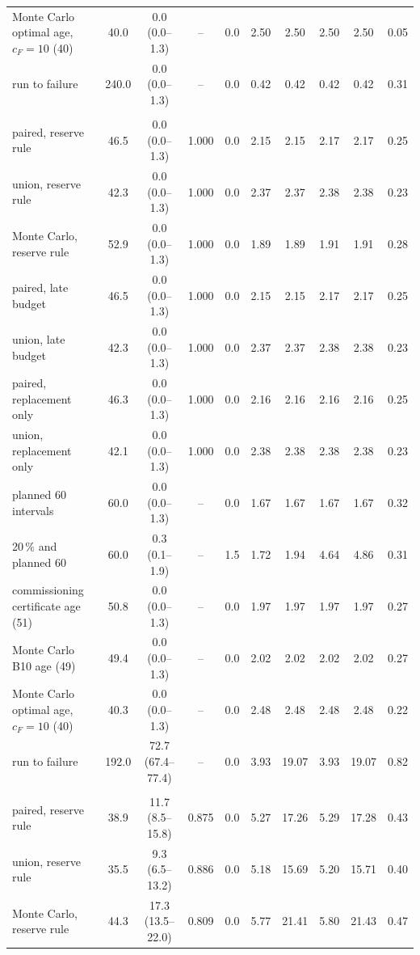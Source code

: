 \begin{table}[htbp]
\begin{tabular*}{\textwidth}{@{\extracolsep{\fill}}lccccccccc@{}}
Monte Carlo optimal age, $c_F=10$ (40) & 40.0 & 0.0 (0.0--1.3) & -- & 0.0 & 2.50 & 2.50 & 2.50 & 2.50 & 0.05 \\
run to failure & 240.0 & 0.0 (0.0--1.3) & -- & 0.0 & 0.42 & 0.42 & 0.42 & 0.42 & 0.31 \\
\addlinespace
\multicolumn{10}{@{}l}{\textit{adverse, cruising}} \\
paired, reserve rule & 46.5 & 0.0 (0.0--1.3) & 1.000 & 0.0 & 2.15 & 2.15 & 2.17 & 2.17 & 0.25 \\
union, reserve rule & 42.3 & 0.0 (0.0--1.3) & 1.000 & 0.0 & 2.37 & 2.37 & 2.38 & 2.38 & 0.23 \\
Monte Carlo, reserve rule & 52.9 & 0.0 (0.0--1.3) & 1.000 & 0.0 & 1.89 & 1.89 & 1.91 & 1.91 & 0.28 \\
paired, late budget & 46.5 & 0.0 (0.0--1.3) & 1.000 & 0.0 & 2.15 & 2.15 & 2.17 & 2.17 & 0.25 \\
union, late budget & 42.3 & 0.0 (0.0--1.3) & 1.000 & 0.0 & 2.37 & 2.37 & 2.38 & 2.38 & 0.23 \\
paired, replacement only & 46.3 & 0.0 (0.0--1.3) & 1.000 & 0.0 & 2.16 & 2.16 & 2.16 & 2.16 & 0.25 \\
union, replacement only & 42.1 & 0.0 (0.0--1.3) & 1.000 & 0.0 & 2.38 & 2.38 & 2.38 & 2.38 & 0.23 \\
planned 60 intervals & 60.0 & 0.0 (0.0--1.3) & -- & 0.0 & 1.67 & 1.67 & 1.67 & 1.67 & 0.32 \\
20\,\% and planned 60 & 60.0 & 0.3 (0.1--1.9) & -- & 1.5 & 1.72 & 1.94 & 4.64 & 4.86 & 0.31 \\
commissioning certificate age (51) & 50.8 & 0.0 (0.0--1.3) & -- & 0.0 & 1.97 & 1.97 & 1.97 & 1.97 & 0.27 \\
Monte Carlo B10 age (49) & 49.4 & 0.0 (0.0--1.3) & -- & 0.0 & 2.02 & 2.02 & 2.02 & 2.02 & 0.27 \\
Monte Carlo optimal age, $c_F=10$ (40) & 40.3 & 0.0 (0.0--1.3) & -- & 0.0 & 2.48 & 2.48 & 2.48 & 2.48 & 0.22 \\
run to failure & 192.0 & 72.7 (67.4--77.4) & -- & 0.0 & 3.93 & 19.07 & 3.93 & 19.07 & 0.82 \\
\addlinespace
\multicolumn{10}{@{}l}{\textit{beyond, cruising}} \\
paired, reserve rule & 38.9 & 11.7 (8.5--15.8) & 0.875 & 0.0 & 5.27 & 17.26 & 5.29 & 17.28 & 0.43 \\
union, reserve rule & 35.5 & 9.3 (6.5--13.2) & 0.886 & 0.0 & 5.18 & 15.69 & 5.20 & 15.71 & 0.40 \\
Monte Carlo, reserve rule & 44.3 & 17.3 (13.5--22.0) & 0.809 & 0.0 & 5.77 & 21.41 & 5.80 & 21.43 & 0.47 \\

\end{tabular*}
\end{table}
